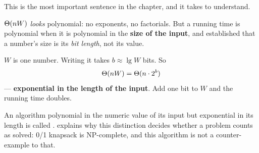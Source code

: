\begin{alertbox}
This is the most important sentence in the chapter, and it takes
 to understand.

\smallskip
$\Theta(nW)$ \emph{looks} polynomial: no exponents, no factorials. But a
running time is polynomial when it is polynomial in the \textbf{size of the
input}, and  established that a number's size is its \emph{bit
length}, not its value.

\smallskip
$W$ is one number. Writing it takes $b \approx \lg W$ bits. So
\[ \Theta(nW) = \Theta(n \cdot 2^{b}) \]
--- \textbf{exponential in the length of the input}. Add one bit to $W$ and the
running time doubles.

\smallskip
An algorithm polynomial in the numeric value of its input but exponential in
its length is called .  explains why
this distinction decides whether a problem counts as solved: 0/1 knapsack is
NP-complete, and this algorithm is not a counter-example to that.
\end{alertbox}


